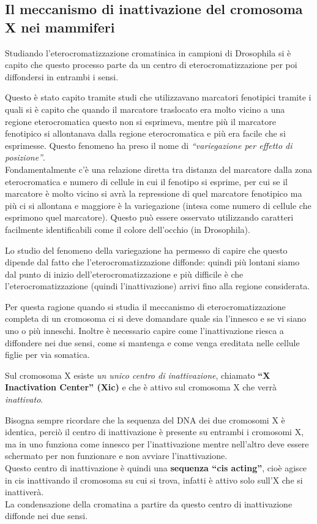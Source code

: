 \documentclass[11pt]{book}
\begin{document}
\subsection{Il meccanismo di inattivazione del cromosoma X nei mammiferi}

Studiando l'eterocromatizzazione cromatinica in campioni di Drosophila si è capito che questo processo parte da un centro di eterocromatizzazione per poi diffondersi in entrambi i sensi.

Questo è stato capito tramite studi che utilizzavano marcatori fenotipici tramite i quali si è capito che quando il marcatore traslocato era molto vicino a una regione eterocromatica questo non si esprimeva, mentre più il marcatore fenotipico si allontanava dalla regione eterocromatica e più era facile che si esprimesse.
Questo fenomeno ha preso il nome di \emph{``variegazione per effetto di posizione''}.\\
Fondamentalmente c’è una relazione diretta tra distanza del marcatore dalla zona eterocromatica e numero di cellule in cui il fenotipo si esprime, per cui se il marcatore è molto vicino si avrà la repressione di quel marcatore fenotipico ma più ci si allontana e maggiore è la variegazione (intesa come numero di cellule che esprimono quel marcatore). Questo può essere osservato utilizzando caratteri facilmente identificabili come il colore dell’occhio (in Drosophila).
 
Lo studio del fenomeno della variegazione ha permesso di capire che questo dipende dal fatto che l’eterocromatizzazione diffonde: quindi più lontani siamo dal punto di inizio dell’eterocromatizzazione e più difficile è che l’eterocromatizzazione (quindi l’inattivazione) arrivi fino alla regione considerata.

Per questa ragione quando si studia il meccanismo di eterocromatizzazione completa di un cromosoma ci si deve domandare quale sia l’innesco e se vi siano uno o più inneschi. Inoltre è necessario capire come l’inattivazione riesca a diffondere nei due sensi, come si mantenga e come venga ereditata nelle cellule figlie per via somatica.

Sul cromosoma X esiste \emph{un unico centro di inattivazione}, chiamato\textbf{ ``X Inactivation Center'' (Xic)} e che è attivo sul cromosoma X che verrà \emph{inattivato}.

Bisogna sempre ricordare che la sequenza del DNA dei due cromosomi X è identica, perciò il centro di inattivazione è presente su entrambi i cromosomi X, ma in uno funziona come innesco per l’inattivazione mentre nell’altro deve essere schermato per non funzionare e non avviare l’inattivazione.\\
Questo centro di inattivazione è quindi una \textbf{sequenza ``cis acting''}, cioè agisce in cis inattivando il cromosoma su cui si trova, infatti è attivo solo sull’X che si inattiverà.\\
La condensazione della cromatina a partire da questo centro di inattivazione diffonde nei due sensi.
\end{document}

